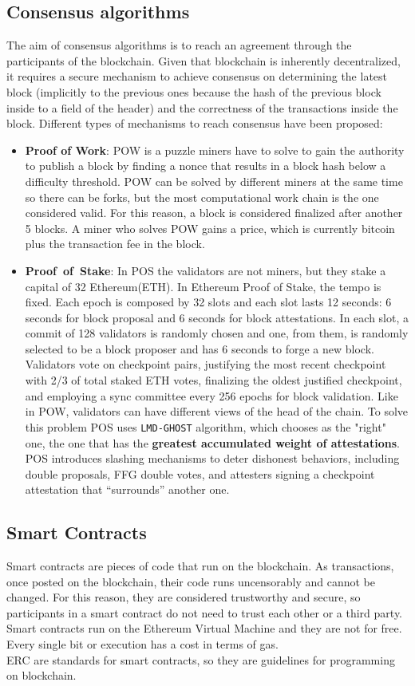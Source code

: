 \documentclass[main.tex]{subfiles}
\begin{document}
\subsection{Consensus algorithms}
The aim of consensus algorithms is to reach an agreement through the participants of the blockchain. 
Given that blockchain is inherently decentralized, it requires a secure mechanism to achieve consensus on determining the latest block (implicitly to the previous ones because the hash of the previous block inside to a field of the header) and the correctness of the transactions inside the block.
Different types of mechanisms to reach consensus have been proposed:
\begin{itemize}
    \item \textbf{Proof of Work}: POW is a puzzle miners have to solve to gain the authority to publish a block by finding a nonce that results in a block hash below a difficulty threshold. POW can be solved by different miners at the same time so there can be forks, but the most computational work chain is the one considered valid. 
    For this reason, a block is considered finalized after another 5 blocks. A miner who solves POW gains a price, which is currently bitcoin plus the transaction fee in the block.
    \item \textbf{Proof\ of\ Stake}: In POS the validators are not miners, but they stake a capital of 32 Ethereum(ETH). 
    In Ethereum Proof of Stake, the tempo is fixed.
    Each epoch is composed by 32 slots and each slot lasts 12 seconds: 6 seconds for block proposal and 6 seconds for block attestations. In each slot, a commit of 128 validators is randomly chosen and one, from them, is randomly selected to be a block proposer and has 6 seconds to forge a new block.
    Validators vote on checkpoint pairs, justifying the most recent checkpoint with 2/3 of total staked ETH votes, finalizing the oldest justified checkpoint, and employing a sync committee every 256 epochs for block validation.
    Like in POW, validators can have different views of the head of the chain. To solve this problem POS uses \texttt{LMD-GHOST}  algorithm, which chooses as the "right" one, the one that has the \textbf{greatest accumulated weight of attestations}.
    POS introduces slashing mechanisms to deter dishonest behaviors, including double proposals, FFG double votes, and attesters signing a checkpoint attestation that “surrounds” another one.
\end{itemize}

\subsection{Smart Contracts}
    Smart contracts are pieces of code that run on the blockchain. As transactions, once posted on the blockchain, their code runs uncensorably and cannot be changed. For this reason, they are considered trustworthy and secure, so participants in a smart contract do not need to trust each other or a third party.
    Smart contracts run on the Ethereum Virtual Machine and they are not for free. Every single bit or execution has a cost in terms of gas.\\
    ERC are standards for smart contracts, so they are guidelines for programming on blockchain. 
\end{document}
